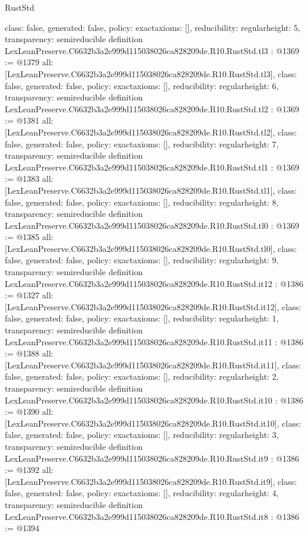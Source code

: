 \begin{lexlean}{RustStd}
\begin{coremodule}
{  class: false,
  generated: false,
  policy: exact{axioms: []},
  reducibility: regular{height: 5},
  transparency: semireducible
}
definition LexLeanPreserve.C6632b3a2e999d115038026ca828209de.R10.RustStd.tl3 : @1369 := @1379 {
  all: [LexLeanPreserve.C6632b3a2e999d115038026ca828209de.R10.RustStd.tl3],
  class: false,
  generated: false,
  policy: exact{axioms: []},
  reducibility: regular{height: 6},
  transparency: semireducible
}
definition LexLeanPreserve.C6632b3a2e999d115038026ca828209de.R10.RustStd.tl2 : @1369 := @1381 {
  all: [LexLeanPreserve.C6632b3a2e999d115038026ca828209de.R10.RustStd.tl2],
  class: false,
  generated: false,
  policy: exact{axioms: []},
  reducibility: regular{height: 7},
  transparency: semireducible
}
definition LexLeanPreserve.C6632b3a2e999d115038026ca828209de.R10.RustStd.tl1 : @1369 := @1383 {
  all: [LexLeanPreserve.C6632b3a2e999d115038026ca828209de.R10.RustStd.tl1],
  class: false,
  generated: false,
  policy: exact{axioms: []},
  reducibility: regular{height: 8},
  transparency: semireducible
}
definition LexLeanPreserve.C6632b3a2e999d115038026ca828209de.R10.RustStd.tl0 : @1369 := @1385 {
  all: [LexLeanPreserve.C6632b3a2e999d115038026ca828209de.R10.RustStd.tl0],
  class: false,
  generated: false,
  policy: exact{axioms: []},
  reducibility: regular{height: 9},
  transparency: semireducible
}
definition LexLeanPreserve.C6632b3a2e999d115038026ca828209de.R10.RustStd.it12 : @1386 := @1327 {
  all: [LexLeanPreserve.C6632b3a2e999d115038026ca828209de.R10.RustStd.it12],
  class: false,
  generated: false,
  policy: exact{axioms: []},
  reducibility: regular{height: 1},
  transparency: semireducible
}
definition LexLeanPreserve.C6632b3a2e999d115038026ca828209de.R10.RustStd.it11 : @1386 := @1388 {
  all: [LexLeanPreserve.C6632b3a2e999d115038026ca828209de.R10.RustStd.it11],
  class: false,
  generated: false,
  policy: exact{axioms: []},
  reducibility: regular{height: 2},
  transparency: semireducible
}
definition LexLeanPreserve.C6632b3a2e999d115038026ca828209de.R10.RustStd.it10 : @1386 := @1390 {
  all: [LexLeanPreserve.C6632b3a2e999d115038026ca828209de.R10.RustStd.it10],
  class: false,
  generated: false,
  policy: exact{axioms: []},
  reducibility: regular{height: 3},
  transparency: semireducible
}
definition LexLeanPreserve.C6632b3a2e999d115038026ca828209de.R10.RustStd.it9 : @1386 := @1392 {
  all: [LexLeanPreserve.C6632b3a2e999d115038026ca828209de.R10.RustStd.it9],
  class: false,
  generated: false,
  policy: exact{axioms: []},
  reducibility: regular{height: 4},
  transparency: semireducible
}
definition LexLeanPreserve.C6632b3a2e999d115038026ca828209de.R10.RustStd.it8 : @1386 := @1394 {
}
\end{coremodule}
\end{lexlean}
